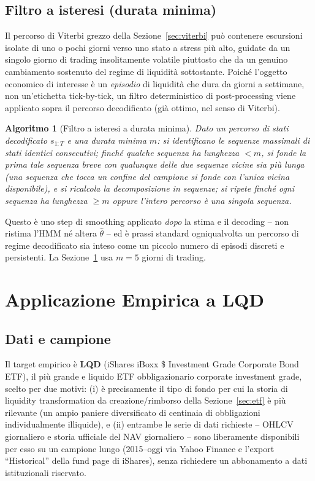 \documentclass[11pt]{article}
\newtheorem{algorithm}[theorem]{Algoritmo}
\theoremstyle{definition}
\theoremstyle{remark}
\begin{document}
\subsection{Filtro a isteresi (durata minima)}
\label{sec:hysteresis}

Il percorso di Viterbi grezzo della Sezione~\ref{sec:viterbi} pu\`o contenere escursioni isolate di uno o pochi giorni verso uno stato a stress pi\`u alto, guidate da un singolo giorno di trading insolitamente volatile piuttosto che da un genuino cambiamento sostenuto del regime di liquidit\`a sottostante. Poich\'e l'oggetto economico di interesse \`e un \emph{episodio} di liquidit\`a che dura da giorni a settimane, non un'etichetta tick-by-tick, un filtro deterministico di post-processing viene applicato sopra il percorso decodificato (gi\`a ottimo, nel senso di Viterbi).

\begin{algorithm}[Filtro a isteresi a durata minima]
\label{alg:hysteresis}
Dato un percorso di stati decodificato $s_{1:T}$ e una durata minima $m$: si identificano le sequenze massimali di stati identici consecutivi; finch\'e qualche sequenza ha lunghezza $<m$, si fonde la \emph{prima} tale sequenza breve con qualunque delle due sequenze vicine sia pi\`u lunga (una sequenza che tocca un confine del campione si fonde con l'unica vicina disponibile), e si ricalcola la decomposizione in sequenze; si ripete finch\'e ogni sequenza ha lunghezza $\ge m$ oppure l'intero percorso \`e una singola sequenza.
\end{algorithm}
Questo \`e uno step di smoothing applicato \emph{dopo} la stima e il decoding -- non ristima l'HMM n\'e altera $\widehat\theta$ -- ed \`e prassi standard ogniqualvolta un percorso di regime decodificato sia inteso come un piccolo numero di episodi discreti e persistenti. La Sezione~\ref{sec:empirical} usa $m=5$ giorni di trading.

\section{Applicazione Empirica a LQD}
\label{sec:empirical}

\subsection{Dati e campione}

Il target empirico \`e \textbf{LQD} (iShares iBoxx \$ Investment Grade Corporate Bond ETF), il pi\`u grande e liquido ETF obbligazionario corporate investment grade, scelto per due motivi: (i) \`e precisamente il tipo di fondo per cui la storia di liquidity transformation da creazione/rimborso della Sezione~\ref{sec:etf} \`e pi\`u rilevante (un ampio paniere diversificato di centinaia di obbligazioni individualmente illiquide), e (ii) entrambe le serie di dati richieste -- OHLCV giornaliero e storia ufficiale del NAV giornaliero -- sono liberamente disponibili per esso su un campione lungo (2015--oggi via Yahoo Finance e l'export ``Historical'' della fund page di iShares), senza richiedere un abbonamento a dati istituzionali riservato.
\end{document}
